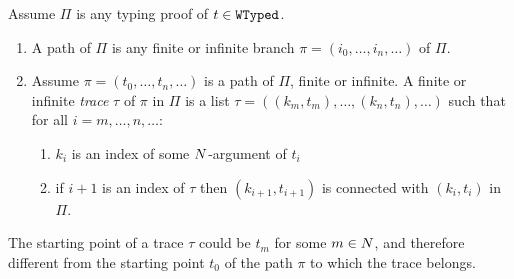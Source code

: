 \begin{definition}
Assume $\Pi$ is any typing proof of $t \in {\tt WTyped}$.
\begin{enumerate}
\item
A path of $\Pi$ is any finite or infinite branch $\pi =(i_0, \ldots, i_n, \ldots)$ of $\Pi$.

\item
Assume $\pi =(t_0, \ldots, t_n, \ldots)$ is a path of $\Pi$, finite or infinite. 
A finite or infinite \emph{trace} $\tau$ of $\pi$ in $\Pi$ is a list 
$\tau =( (k_m,t_m), \ldots, (k_n,t_n), \ldots)$ such that for all $i=m,\ldots, n,\ldots$:
\begin{enumerate}
\item
$k_i$ is an index of some ${N}$-argument of $t_i$
\item
if $i+1$ is an index of $\tau$ then $(k_{i+1},t_{i+1})$ is connected with $(k_i, t_i)$ in $\Pi$.
\end{enumerate}

\end{enumerate}
\end{definition}

The starting point of a trace $\tau$ could be $t_m$ for some $m \in {N}$, 
and therefore different from the starting point $t_0$ of the path $\pi$ to which the 
trace belongs.

